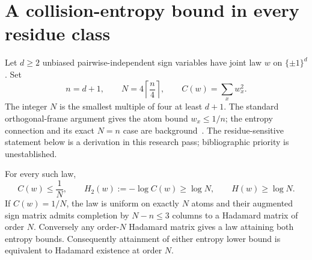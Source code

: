 \section{A collision-entropy bound in every residue class}
\label{sec:residue-bound}
Let $d\ge2$ unbiased pairwise-independent sign variables have joint
law $w$ on $\{\pm1\}^d$. Set
\[
 n=d+1,\qquad N=4\left\lceil\frac n4\right\rceil,
 \qquad C(w)=\sum_xw_x^2.
\]
The integer $N$ is the smallest multiple of four at least $d+1$.
The standard orthogonal-frame argument gives the atom bound
$w_x\le1/n$; the entropy connection and its exact $N=n$ case are
background~\cite{GP}. The residue-sensitive statement below is a
derivation in this research pass; bibliographic priority is unestablished.

\begin{theorem}
\label{thm:residue-bound}
For every such law,
\[
 C(w)\le\frac1N,\qquad
 H_2(w):=-\log C(w)\ge\log N,\qquad H(w)\ge\log N.
\]
If $C(w)=1/N$, the law is uniform on exactly $N$ atoms and their
augmented sign matrix admits completion by $N-n\le3$ columns to a
Hadamard matrix of order $N$. Conversely any order-$N$ Hadamard matrix
gives a law attaining both entropy bounds. Consequently attainment
of either entropy lower bound is equivalent to Hadamard existence
at order $N$.
\end{theorem}

